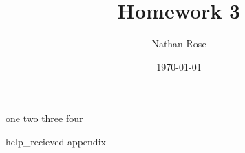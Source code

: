 \documentclass[11pt]{article}
\title{Homework 3}
\author{Nathan Rose}
\date{\today}
\begin{document}
\maketitle
\begin{enumerate}
  {one}
  {two}
  {three}
  {four}
\end{enumerate}
{help_recieved}
{appendix}
\end{document}
